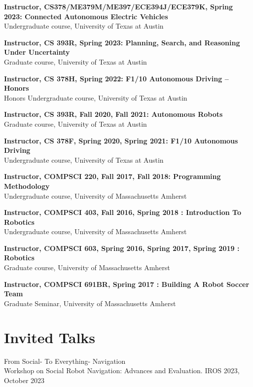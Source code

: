 \documentclass[Times]{article}
\begin{document}
{\bf Instructor, CS378/ME379M/ME397/ECE394J/ECE379K, Spring 2023: Connected  Autonomous Electric  Vehicles}\\
Undergraduate course, University of Texas at Austin

{\bf Instructor, CS 393R, Spring 2023: Planning, Search, and Reasoning Under Uncertainty}\\
Graduate course, University of Texas at Austin

{\bf Instructor, CS 378H, Spring 2022: F1/10 Autonomous Driving -- Honors}\\
Honors Undergraduate course, University of Texas at Austin

{\bf Instructor, CS 393R, Fall 2020, Fall 2021: Autonomous Robots}\\
Graduate course, University of Texas at Austin

{\bf Instructor, CS 378F, Spring 2020, Spring 2021: F1/10 Autonomous Driving}\\
Undergraduate course, University of Texas at Austin

{\bf Instructor, COMPSCI 220, Fall 2017, Fall 2018: Programming Methodology}\\
Undergraduate course, University of Massachusetts Amherst

{\bf Instructor, COMPSCI 403, Fall 2016, Spring 2018 : Introduction To
Robotics}\\
Undergraduate course, University of Massachusetts Amherst

{\bf Instructor, COMPSCI 603, Spring 2016, Spring 2017, Spring 2019 : Robotics}\\
\hfill Graduate course, University of Massachusetts Amherst

{\bf Instructor, COMPSCI 691BR, Spring 2017 : Building A Robot Soccer Team}\\
Graduate Seminar, University of Massachusetts Amherst

\begin{comment}
Updates:
5. Find all SPC, PC appointments
6. List all students
\end{comment}

\section*{Invited Talks}

From Social- To Everything- Navigation
\\
{Workshop on Social Robot Navigation: Advances and Evaluation. IROS 2023},
October 2023
\end{document}
